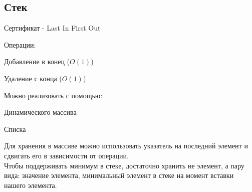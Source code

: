 \documentclass[a4paper,10pt]{article}
\begin{document}
	\subsection{Стек}
		Сертификат - Last In First Out \\
	\begin{center}
		Операции: \\
		\item Добавление в конец ($O(1)$)
		\item Удаление с конца ($O(1)$)
	\end{center}
	\begin{center}
		Можно реализовать с помощью: \\
		\item Динамического массива
		\item Списка
	\end{center}
	Для хранения в массиве можно использовать указатель на последний элемент и сдвигать его в зависимости от операции. \\
	Чтобы поддерживать минимум в стеке, достаточно хранить не элемент, а пару вида: значение элемента, минимальный элемент в стеке на момент вставки нашего элемента. \\
\end{document}

